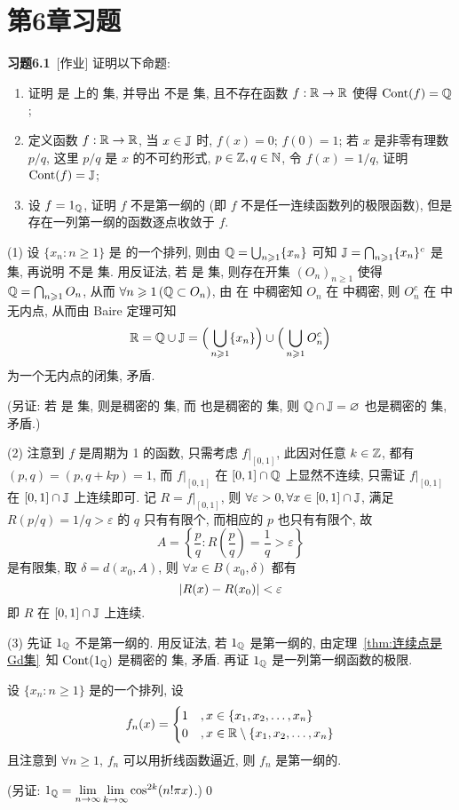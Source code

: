 \section{第6章习题}
	
	\textbf{习题6.1}\ [作业] 证明以下命题:
	\begin{enumerate}[(1)]
		\item 证明 \J 是 \R 上的 \Gd 集, 并导出 \Q 不是 \Gd 集, 且不存在函数 $ f:\mathbb{R}\to\mathbb{R} $ 使得 $ \operatorname{Cont}(f)=\mathbb{Q} $;
		\item 定义函数 $ f:\mathbb{R}\to\mathbb{R} $, 当 $ x\in\mathbb{J} $ 时, $ f(x)=0 $; $ f(0)=1 $; 若 $ x $ 是非零有理数 $ p/q $, 这里 $ p/q $ 是 $ x $ 的不可约形式, $ p\in\mathbb{Z}, q\in\mathbb{N} $, 令 $ f(x)=1/q $, 证明 $ \operatorname{Cont}(f)=\mathbb{J} $;
		\item 设 $ f=1_{\mathbb{Q}} $, 证明 $ f $ 不是第一纲的 (即 $ f $ 不是任一连续函数列的极限函数), 但是存在一列第一纲的函数逐点收敛于 $ f $.
	\end{enumerate}
	\begin{Proof}
		(1) 设 $ \{ x_{n}:n\geqslant1\} $ 是 \Q 的一个排列, 则由 $ \mathbb{Q}=\bigcup_{n\geqslant1}\{ x_{n} \} $ 可知 $ \mathbb{J} =\bigcap_{n\geqslant1}\{ x_{n} \}^{c} $ 是 \Gd 集, 再说明 \Q 不是 \Gd 集. 用反证法, 若 \Q 是 \Gd 集, 则存在开集 $ (O_{n})_{n\geqslant1} $ 使得 $ \mathbb{Q} = \bigcap_{n\geqslant1}O_{n} $, 从而 $ \forall n\geqslant1\,(\mathbb{Q}\subset O_{n}) $, 由 \Q 在 \R 中稠密知 $ O_{n} $ 在 \R 中稠密, 则 $ O_{n}^{c} $ 在 \R 中无内点, 从而由 Baire 定理可知
		\[
			\mathbb{R} = \mathbb{Q}\cup\mathbb{J} = \Big( \bigcup_{n\geqslant1}\{ x_{n} \} \Big)\cup\Big( \bigcup_{n\geqslant1}O_{n}^{c} \Big)
		\]
		为一个无内点的闭集, 矛盾. 

		(另证: 若 \Q 是 \Gd 集, 则\Q 是稠密的 \Gd 集, 而 \J 也是稠密的 \Gd 集, 则 $ \mathbb{Q}\cap\mathbb{J}=\varnothing $ 也是稠密的 \Gd 集, 矛盾.)

		(2) 注意到 $ f $ 是周期为 1 的函数, 只需考虑 $ f|_{[0, 1]} $, 此因对任意 $ k\in\mathbb{Z} $, 都有 $ (p, q)=(p, q+kp)=1 $, 而 $ f|_{[0, 1]} $ 在 $ [0, 1]\cap\mathbb{Q} $ 上显然不连续, 只需证 $ f|_{[0, 1]} $ 在 $ [0, 1]\cap\mathbb{J} $ 上连续即可. 记 $ R = f|_{[0, 1]} $, 则 $ \forall \varepsilon>0, \forall x\in[0, 1]\cap\mathbb{J} $, 满足 $ R(p/q)=1/q>\varepsilon $ 的 $ q $ 只有有限个, 而相应的 $ p $ 也只有有限个, 故
		\[
			A=\left\{ \frac{p}{q}:R\left( \frac{p}{q} \right)=\frac{1}{q}>\varepsilon \right\}
		\]
		是有限集, 取 $ \delta = d(x_{0}, A) $, 则 $ \forall x\in B(x_{0}, \delta) $ 都有
		\[
			\left| R(x)-R(x_{0}) \right| <\varepsilon
		\]
		即 $ R $ 在 $ [0, 1]\cap\mathbb{J} $ 上连续.

		(3) 先证 $ 1_{\mathbb{Q}} $ 不是第一纲的. 用反证法, 若 $ 1_{\mathbb{Q}} $ 是第一纲的, 由定理~\ref{thm:连续点是Gd集}~知 $ \operatorname{Cont}(1_{\mathbb{Q}}) $ 是稠密的 \Gd 集, 矛盾. 再证 $ 1_{\mathbb{Q}} $ 是一列第一纲函数的极限.

		设 $ \{ x_{n}:n\geqslant1\} $ 是\Q 的一个排列, 设
		\[
			f_{n}(x)=\begin{cases}
				1 & , x\in\{ x_{1}, x_{2}, \dots, x_{n} \}\\
				0 & , x\in\mathbb{R}\setminus\{ x_{1}, x_{2}, \dots, x_{n} \}
			\end{cases}
		\]
		且注意到 $ \forall n\geqslant1 $, $ f_{n} $ 可以用折线函数逼近, 则 $ f_{n} $ 是第一纲的.

		(另证: $ 1_{\mathbb{Q}}=\lim\limits_{n\to \infty}\lim\limits_{k\to\infty}\cos^{2k}(n!\pi x) $.)\qed
	\end{Proof}	

